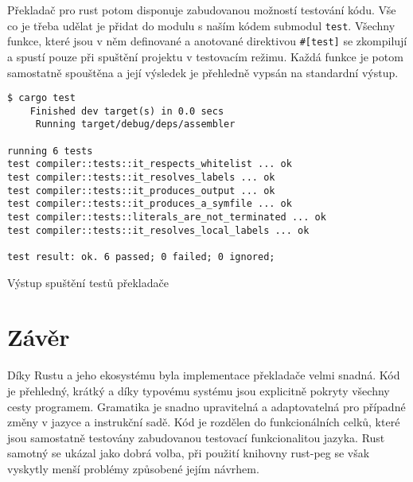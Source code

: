Překladač pro rust potom disponuje zabudovanou možností testování kódu. Vše co je třeba udělat je přidat do modulu s naším kódem submodul \texttt{test}. Všechny funkce, které jsou v něm definované a anotované direktivou \texttt{#[test]} se zkompilují a spustí pouze při spuštění projektu v testovacím režimu. Každá funkce je potom samostatně spouštěna a její výsledek je přehledně vypsán na standardní výstup.

\begin{listing}
\begin{verbatim}
$ cargo test
    Finished dev target(s) in 0.0 secs
     Running target/debug/deps/assembler

running 6 tests
test compiler::tests::it_respects_whitelist ... ok
test compiler::tests::it_resolves_labels ... ok
test compiler::tests::it_produces_output ... ok
test compiler::tests::it_produces_a_symfile ... ok
test compiler::tests::literals_are_not_terminated ... ok
test compiler::tests::it_resolves_local_labels ... ok

test result: ok. 6 passed; 0 failed; 0 ignored;
\end{verbatim}
\caption{Výstup spuštění testů překladače}
\label{fig:rust-test}
\end{listing}

\section{Závěr}

Díky Rustu a jeho ekosystému byla implementace překladače velmi snadná. Kód je přehledný, krátký a díky typovému systému jsou explicitně pokryty všechny cesty programem. Gramatika je snadno upravitelná a adaptovatelná pro případné změny v jazyce a instrukční sadě. Kód je rozdělen do funkcionálních celků, které jsou samostatně testovány zabudovanou testovací funkcionalitou jazyka. Rust samotný se ukázal jako dobrá volba, při použití knihovny rust-peg se však vyskytly menší problémy způsobené jejím návrhem.
